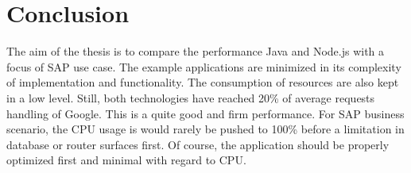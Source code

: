 \chapter{Conclusion}
The aim of the thesis is to compare the performance Java and Node.js with a focus of SAP use case. The example applications are minimized in its complexity of implementation and functionality. The consumption of resources are also kept in a low level. Still, both technologies have reached 20\% of average requests handling of Google\citep{Google}. This is a quite good and firm performance. For SAP business scenario, the CPU usage is would rarely be pushed to 100\% before a limitation in database or router surfaces first. Of course, the application should be properly optimized first and minimal with regard to CPU. 

